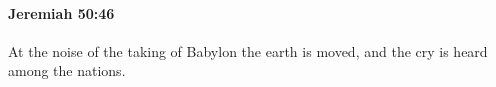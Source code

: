 
		\paragraph{Jeremiah 50:46} %
			\label{JEREMIAH-50-46}

			At the noise of the taking of Babylon the earth is moved, and the cry is heard among the nations.

